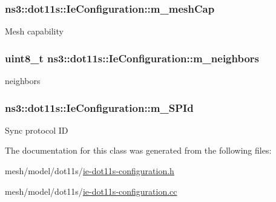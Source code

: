 \subsubsection[{\texorpdfstring{m\+\_\+mesh\+Cap}{m_meshCap}}]{ ns3\+::dot11s\+::\+Ie\+Configuration\+::m\+\_\+mesh\+Cap\hspace{0.3cm}{\ttfamily [private]}}\hypertarget{classns3_1_1dot11s_1_1IeConfiguration_a1f225db31ce052cb7a9b880651a1f2ea}{}\label{classns3_1_1dot11s_1_1IeConfiguration_a1f225db31ce052cb7a9b880651a1f2ea}
Mesh capability 
\subsubsection[{\texorpdfstring{m\+\_\+neighbors}{m_neighbors}}]{\setlength{\rightskip}{0pt plus 5cm}uint8\+\_\+t ns3\+::dot11s\+::\+Ie\+Configuration\+::m\+\_\+neighbors\hspace{0.3cm}{\ttfamily [private]}}\hypertarget{classns3_1_1dot11s_1_1IeConfiguration_abc1ef247c86ee7edba5f08305aee8264}{}\label{classns3_1_1dot11s_1_1IeConfiguration_abc1ef247c86ee7edba5f08305aee8264}


neighbors 

\subsubsection[{\texorpdfstring{m\+\_\+\+S\+P\+Id}{m_SPId}}]{ ns3\+::dot11s\+::\+Ie\+Configuration\+::m\+\_\+\+S\+P\+Id\hspace{0.3cm}{\ttfamily [private]}}\hypertarget{classns3_1_1dot11s_1_1IeConfiguration_acfce7f7c1ee695aa2678f6085d182304}{}\label{classns3_1_1dot11s_1_1IeConfiguration_acfce7f7c1ee695aa2678f6085d182304}
Sync protocol ID 

The documentation for this class was generated from the following files\+:\begin{DoxyCompactItemize}
\item 
mesh/model/dot11s/\hyperlink{ie-dot11s-configuration_8h}{ie-\/dot11s-\/configuration.\+h}\item 
mesh/model/dot11s/\hyperlink{ie-dot11s-configuration_8cc}{ie-\/dot11s-\/configuration.\+cc}\end{DoxyCompactItemize}
